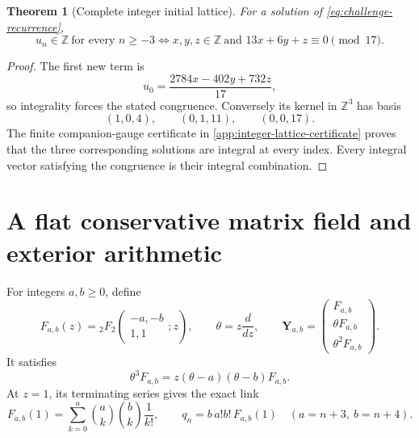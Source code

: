 \documentclass[11pt]{article}
\theoremstyle{keio}
\newtheorem{theorem}{Theorem}[section]
\theoremstyle{definition}
\theoremstyle{remark}
\newcommand{\Z}{\mathbb Z}
\begin{document}
\begin{theorem}[Complete integer initial lattice]
\label{thm:ram-integer-lattice}
For a solution of \eqref{eq:challenge-recurrence},
\begin{equation}\label{eq:integer-lattice}
 \boxed{\displaystyle
 u_n\in\Z\ \text{for every }n\ge-3
 \Longleftrightarrow
 x,y,z\in\Z\ \text{and }13x+6y+z\equiv0\pmod{17}.}
\end{equation}
\end{theorem}

\begin{proof}
The first new term is
\begin{equation}\label{eq:u0-congruence}
 u_0=\frac{2784x-402y+732z}{17},
\end{equation}
so integrality forces the stated congruence.  Conversely its kernel in
\(\Z^3\) has basis
\[
 (1,0,4),\qquad(0,1,11),\qquad(0,0,17).
\]
The finite companion-gauge certificate in
\cref{app:integer-lattice-certificate} proves that the three corresponding
solutions are integral at every index.  Every integral vector satisfying the
congruence is their integral combination.
\end{proof}

\section{A flat conservative matrix field and exterior arithmetic}
\label{sec:cmf}

For integers \(a,b\ge0\), define
\begin{equation}\label{eq:Fab}
 F_{a,b}(z)={}_{2}F_{2}
 \!\left(\begin{matrix}-a,-b\\1,1\end{matrix};z\right),
 \qquad
 \theta=z\frac d{dz},
 \qquad
 \mathbf Y_{a,b}=
 \begin{pmatrix}F_{a,b}\\ \theta F_{a,b}\\ \theta^2F_{a,b}\end{pmatrix}.
\end{equation}
It satisfies
\begin{equation}\label{eq:Fab-ode}
 \theta^3F_{a,b}=z(\theta-a)(\theta-b)F_{a,b}.
\end{equation}
At \(z=1\), its terminating series gives the exact link
\begin{equation}\label{eq:q-Fab-link}
 F_{a,b}(1)=\sum_{k=0}^{a}\binom ak\binom bk\frac1{k!},
 \qquad q_n=b\,a!b!\,F_{a,b}(1)\quad(a=n+3,\ b=n+4).
\end{equation}
\end{document}
